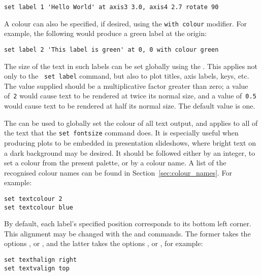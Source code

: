 \begin{verbatim}
set label 1 'Hello World' at axis3 3.0, axis4 2.7 rotate 90
\end{verbatim}

A colour can also be specified, if desired, using the {\tt with colour}
modifier.  For example, the following would produce a green label at the origin:

\begin{verbatim}
set label 2 'This label is green' at 0, 0 with colour green
\end{verbatim}

 The size of the text in such labels can be set
globally using the . This applies not only to the {\tt
set label} command, but also to plot titles, axis labels, keys, etc. The value
supplied should be a multiplicative factor greater than zero; a 
value of~{\tt 2} would cause text to be rendered at twice its normal size, and
a value of~{\tt 0.5} would cause text to be rendered at half its normal size.
The default value is one.

 The  can be
used to globally set the colour of all text output, and applies to all of the
text that the {\tt set fontsize} command does. It is especially useful when
producing plots to be embedded in presentation slideshows, where bright text on
a dark background may be desired. It should be followed either by an integer,
to set a colour from the present palette, or by a colour name. A list of the
recognised colour names can be found in Section~\ref{sec:colour_names}.  For
example:

\begin{verbatim}
set textcolour 2
set textcolour blue
\end{verbatim}

By default, each label's specified
position corresponds to its bottom left corner. This alignment may be changed
with the  and  commands. The
former takes the options ,  or ,
and the latter takes the options ,  or
, for example:

\begin{verbatim}
set texthalign right
set textvalign top
\end{verbatim}

